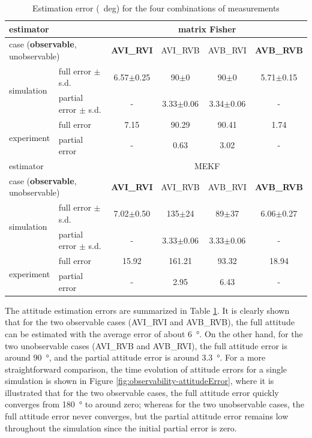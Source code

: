 \begin{table}
	\caption{Estimation error (\SI{}{deg}) for the four combinations of measurements \label{table:observability-error}}
	\centering
	\begin{tabular}{l|l|c|c|c|c}
		\hline\hline
		\multicolumn{2}{l|}{estimator} & \multicolumn{4}{c}{matrix Fisher} \\ \hline
		\multicolumn{2}{l|}{case (\textbf{observable}, unobservable)} & \textbf{AVI\_RVI} & AVI\_RVB & AVB\_RVI & \textbf{AVB\_RVB} \\ \hline
		\multirow{2}{*}{simulation} & full error $\pm$ s.d. & 6.57$\pm$0.25 & 90$\pm$0 & 90$\pm$0 & 5.71$\pm$0.15  \\
		& partial error $\pm$ s.d. & - & 3.33$\pm$0.06 & 3.34$\pm$0.06 & - \\ \hline
		\multirow{2}{*}{experiment} & full error & 7.15 & 90.29 & 90.41 & 1.74 \\
		& partial error & - & 0.63 & 3.02 & - \\ \hline\hline
		\multicolumn{2}{l|}{estimator} & \multicolumn{4}{c}{MEKF} \\ \hline
		\multicolumn{2}{l|}{case (\textbf{observable}, unobservable)} & \textbf{AVI\_RVI} & AVI\_RVB & AVB\_RVI & \textbf{AVB\_RVB} \\ \hline
		\multirow{2}{*}{simulation} & full error $\pm$ s.d. & 7.02$\pm$0.50 & 135$\pm$24 & 89$\pm$37 & 6.06$\pm$0.27 \\
		& partial error $\pm$ s.d. & - & 3.33$\pm$0.06 & 3.33$\pm$0.06 & - \\ \hline
		\multirow{2}{*}{experiment} & full error & 15.92 & 161.21 & 93.32 & 18.94 \\
		& partial error & - & 2.95 & 6.43 & - \\ \hline\hline
	\end{tabular}
\end{table}

The attitude estimation errors are summarized in Table \ref{table:observability-error}.
It is clearly shown that for the two observable cases (AVI\_RVI and AVB\_RVB), the full attitude can be estimated with the average error of about \SI{6}{\degree}.
On the other hand, for the two unobservable cases (AVI\_RVB and AVB\_RVI), the full attitude error is around \SI{90}{\degree}, and the partial attitude error is around \SI{3.3}{\degree}.
For a more straightforward comparison, the time evolution of attitude errors for a single simulation is shown in Figure \ref{fig:observability-attitudeError}, where it is illustrated that for the two observable cases, the full attitude error quickly converges from \SI{180}{\degree} to around zero;
whereas for the two unobservable cases, the full attitude error never converges, but the partial attitude error remains low throughout the simulation since the initial partial error is zero.

